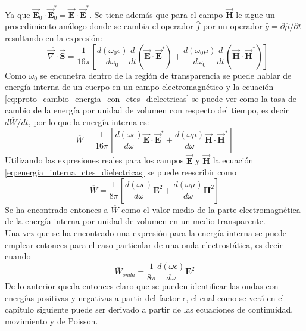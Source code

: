 \documentclass[../tesis_main_file.tex]{subfiles}
\begin{document}
Ya que $\overrightarrow{\textbf{E}}_0\cdot \overrightarrow{\textbf{E}}_0^* = \overrightarrow{\textbf{E}}\cdot \overrightarrow{\textbf{E}}^*$. Se tiene además que para el campo $\overrightarrow{\textbf{H}}$ le sigue un procedimiento análogo donde se cambia el operador $\widehat{f}$ por un operador $\widehat{g}=\partial \widehat{\mu}/\partial t$ resultando en la expresión: 
\begin{equation}
\label{eq:proto_cambio_energia_con_ctes_dielectricas}\overline{-\overrightarrow{\nabla} \cdot \overrightarrow{\textbf{S}}} = \frac{1}{16\pi}\left[\frac{d(\omega_0 \epsilon)}{d\omega_0}\frac{d}{dt}\left(\overrightarrow{\textbf{E}}\cdot \overrightarrow{\textbf{E}}^*\right) + \frac{d(\omega_0 \mu)}{d\omega_0}\frac{d}{dt}\left(\overrightarrow{\textbf{H}}\cdot \overrightarrow{\textbf{H}}^*\right)\right]
\end{equation}
Como $\omega_0$ se encunetra dentro de la región de transparencia se puede hablar de energía interna de un cuerpo en un campo electromagnético y la ecuación \ref{eq:proto_cambio_energia_con_ctes_dielectricas} se puede ver como la tasa de cambio de la energía por unidad de volumen con respecto del tiempo, es decir $d\overline{W}/dt$, por lo que la energía interna es:
\begin{equation}
\label{eq:energia_interna_ctes_dielectricas}
\overline{W}=\frac{1}{16\pi}\left[\frac{d(\omega \epsilon)}{d\omega}\overrightarrow{\textbf{E}}\cdot \overrightarrow{\textbf{E}}^* + \frac{d(\omega \mu )}{d\omega}\overrightarrow{\textbf{H}}\cdot \overrightarrow{\textbf{H}}^*\right]
\end{equation}
Utilizando las expresiones reales para los campos $\overrightarrow{\textbf{E}}$ y $\overrightarrow{\textbf{H}}$ la ecuación \ref{eq:energia_interna_ctes_dielectricas} se puede reescribir como
\begin{equation}
\label{eq:energia_interna_electro_promedio_real}
\overline{W}=\frac{1}{8\pi}\left[\frac{d(\omega \epsilon)}{d\omega}\overline{\textbf{E}^2} + \frac{d(\omega \mu )}{d\omega}\overline{\textbf{H}^2}\right]
\end{equation}
Se ha encontrado entonces a $\overline{W}$ como el valor medio de la parte electromagnética de la energía interna por unidad de volumen en un medio transparente.\\
Una vez que se ha encontrado una expresión para la energía interna se puede emplear entonces para el caso particular de una onda electrostática, es decir cuando
\begin{equation}
\overline{W}_{onda}= \frac{1}{8\pi}\frac{d(\omega \epsilon)}{d\omega}\overline{\textbf{E}^2}
\end{equation}
De lo anterior queda entonces claro que se pueden identificar las ondas con energías positivas y negativas a partir del factor $\epsilon$, el cual como se verá en el capítulo siguiente puede ser derivado a partir de las ecuaciones de continuidad, movimiento y de Poisson.
\end{document}
